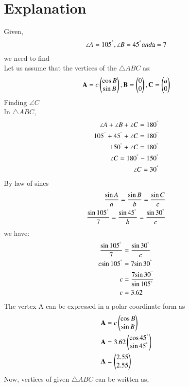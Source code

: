 \documentclass[journal,12pt,twocolumn]{IEEEtran}
\begin{document}
\section{Explanation}
Given,
\begin{align}
\angle A=105^{\degree},\angle B=45^{\degree} and \text{a}=7
\end{align}
we need to find 
\\
Let us assume that the vertices of the $\triangle ABC$ as:
\begin{align}
 \mathbf{A}=c\begin{pmatrix}\cos B\\\sin B\end{pmatrix},\mathbf{B}=\begin{pmatrix}0\\0\end{pmatrix},\mathbf{C}=\begin{pmatrix}a\\0\end{pmatrix}   
 \end{align}
Finding $\angle C$
\\
In $\triangle ABC$,
\begin{align}
\angle A+\angle B+\angle C = 180^{\degree}
\\
105^{\degree}+45^{\degree}+\angle C = 180^{\degree}
\\
150^{\degree}+\angle C = 180^{\degree}
\\
\angle C = 180^{\degree}-150^{\degree}
\\
\angle C = 30^{\degree}
\end{align}
By law of sines
\begin{align}
\frac{\sin A}{a}=\frac{\sin B}{b}=\frac{\sin C}{c}
\\
\frac{\sin 105^{\degree}}{7}=\frac{\sin 45^{\degree}}{b}=\frac{\sin 30^{\degree}}{c}
\end{align}
we have:
\begin{align}
\frac{\sin 105^{\degree}}{7} &=\frac{\sin 30^{\degree}}{c}
\\
c{\sin 105^{\degree}} &=7{\sin 30^{\degree}}
\\
c &=\frac{7{\sin 30^{\degree}}}{\sin 105^{\degree}}
\\
c &=3.62
\end{align}
The vertex A can be expressed in a polar coordinate form as
\begin{align}
 \mathbf{A} &=c\begin{pmatrix}\cos B\\\sin B\end{pmatrix}
 \\
 \mathbf{A} &=3.62\begin{pmatrix}\cos 45^{\degree}\\\sin 45^{\degree}\end{pmatrix}
 \\
 \mathbf{A} &=\begin{pmatrix}2.55\\2.55\end{pmatrix}
 \end{align}
Now, vertices of given $\triangle ABC$ can be written as,
\end{document}
